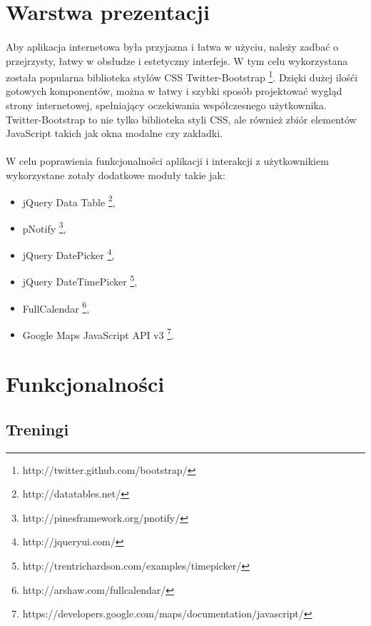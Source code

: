 \newpage
\section{Warstwa prezentacji} %
\label{sec:warstwa_aplikacji}
\paragraph{} %
\label{par:}
Aby aplikacja internetowa była przyjazna i łatwa w użyciu, należy zadbać o przejrzysty, łatwy w obsłudze i estetyczny interfejs. W tym celu wykorzystana została popularna biblioteka stylów CSS Twitter-Bootstrap \footnote{http://twitter.github.com/bootstrap/}. Dzięki dużej ilośći gotowych komponentów, można w łatwy i szybki sposób projektować wygląd strony internetowej, spełniający oczekiwania współczesnego użytkownika. Twitter-Bootstrap to nie tylko biblioteka styli CSS, ale również zbiór elementów JavaScript takich jak okna modalne czy zakładki.

\paragraph{} %
\label{par:}
W celu poprawienia funkcjonalności aplikacji i interakcji z użytkownikiem wykorzystane zotały dodatkowe moduły takie jak:
\begin{itemize}
\item jQuery Data Table \footnote{http://datatables.net/},
\item pNotify \footnote{http://pinesframework.org/pnotify/},
\item jQuery DatePicker \footnote{http://jqueryui.com/},
\item jQuery DateTimePicker \footnote{http://trentrichardson.com/examples/timepicker/},
\item FullCalendar \footnote{http://arshaw.com/fullcalendar/},
\item Google Maps JavaScript API v3 \footnote{https://developers.google.com/maps/documentation/javascript/}.
\end{itemize}


\section{Funkcjonalności} %
\label{sec:funkcjonalno_ci}

\subsection{Treningi} %
\label{sub:treningi}

